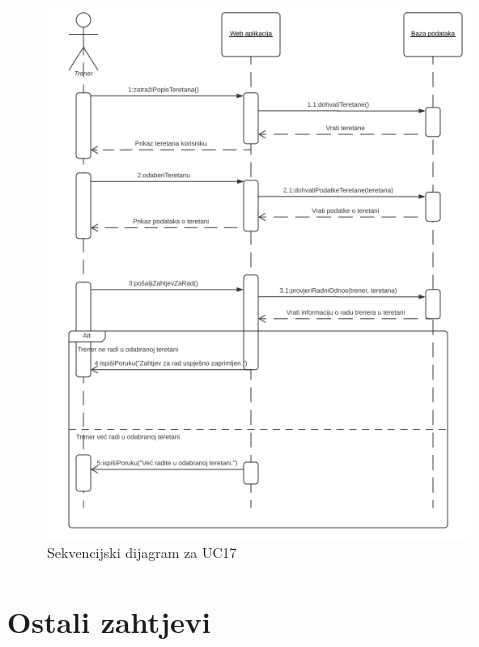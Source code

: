                     \begin{figure}[H]
			            \includegraphics[scale=0.9]{slike/UC17.PNG} %
			            \centering
			            \caption{Sekvencijski dijagram za UC17}
			            \label{fig:promjene}
		            \end{figure}
                    
				
				
				\eject
	            
	            
	            
		\section{Ostali zahtjevi}
		
